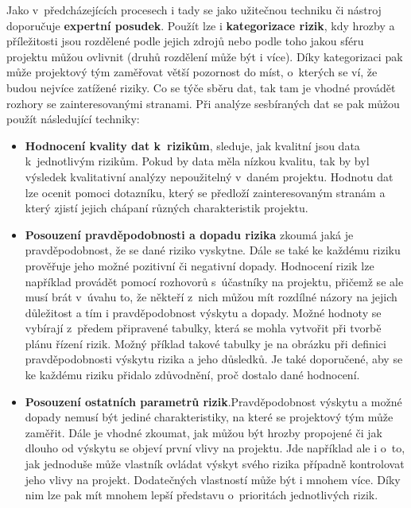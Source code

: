 Jako v~předcházejících procesech i tady se jako užitečnou techniku či nástroj doporučuje \textbf{expertní posudek}. Použít lze i \textbf{kategorizace rizik}, kdy hrozby a příležitosti jsou rozdělené podle jejich zdrojů nebo podle toho jakou sféru projektu můžou ovlivnit (druhů rozdělení může být i více). Díky kategorizaci pak může projektový tým zaměřovat větší pozornost do míst, o~kterých se ví, že budou nejvíce zatížené riziky.  Co se týče sběru dat, tak tam je vhodné provádět rozhory se zainteresovanými stranami. Při analýze sesbíraných dat se pak můžou použít následující techniky:
\begin{itemize}
    \item \textbf{Hodnocení kvality dat k~rizikům}, sleduje, jak kvalitní jsou data k~jednotlivým rizikům. Pokud by data měla nízkou kvalitu, tak by byl výsledek kvalitativní analýzy nepoužitelný v~daném projektu. Hodnotu dat lze ocenit pomoci dotazníku, který se předloží zainteresovaným stranám a který zjistí jejich chápaní různých charakteristik projektu. 
    \item \textbf{Posouzení pravděpodobnosti a dopadu rizika} zkoumá jaká je pravděpodobnost, že se dané riziko vyskytne. Dále se také ke každému riziku prověřuje jeho možné pozitivní či negativní dopady. Hodnocení rizik lze například provádět pomocí rozhovorů s~účastníky na projektu, přičemž se ale musí brát v~úvahu to, že někteří z~nich můžou mít rozdílné názory na jejich důležitost a tím i pravděpodobnost výskytu a dopady. Možné hodnoty se vybírají z~předem připravené tabulky, která se mohla vytvořit při tvorbě plánu řízení rizik. Možný příklad takové tabulky je na obrázku při definici pravděpodobnosti výskytu rizika a jeho důsledků. Je také doporučené, aby se ke každému riziku přidalo zdůvodnění, proč dostalo dané hodnocení. 
    \item \textbf{Posouzení ostatních parametrů rizik}.Pravděpodobnost výskytu a možné dopady nemusí být jediné charakteristiky, na které se projektový tým může zaměřit. Dále je vhodné zkoumat, jak můžou být hrozby propojené či jak dlouho od výskytu se objeví první vlivy na projektu. Jde například ale i o~to, jak jednoduše může vlastník ovládat výskyt svého rizika případně kontrolovat jeho vlivy na projekt. Dodatečných vlastností může být i mnohem více. Díky nim lze pak mít mnohem lepší představu o~prioritách jednotlivých rizik. 
\end{itemize}
